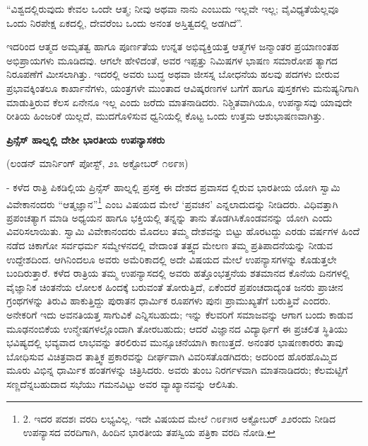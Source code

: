 “ವಿಶ್ವದಲ್ಲಿರುವುದು ಕೇವಲ ಒಂದೇ ಆತ್ಮ; ನೀವು ಅಥವಾ ನಾನು ಎಂಬುದು ಇಲ್ಲವೇ ಇಲ್ಲ; ವೈವಿಧ್ಯತೆಯೆಲ್ಲವೂ ಒಂದು ನಿರಪೇಕ್ಷ ಏಕದಲ್ಲಿ, ದೇವರೆಂಬ ಒಂದು ಅನಂತ ಅಸ್ತಿತ್ವದಲ್ಲಿ ಅಡಗಿದೆ”.

ಇದರಿಂದ ಆತ್ಮದ ಅಮೃತತ್ವ ಹಾಗೂ ಪೂರ್ಣತೆಯ ಉನ್ನತ ಅಭಿವ್ಯಕ್ತಿಯತ್ತ ಆತ್ಮಗಳ ಜನ್ಮಾಂತರ ಪ್ರಯಾಣಂತಹ ಅಭಿಪ್ರಾಯಗಳು ಮೂಡಿದವು. ಆಗಲೇ ಹೇಳಿದಂತೆ, ಅವರ ಇಪ್ಪತ್ತು ನಿಮಿಷಗಳ ಭಾಷಣ ಸಮಾರೋಪ ತ್ಯಾಗದ ನಿರೂಪಣೆಗೆ ಮೀಸಲಾಗಿತ್ತು. ಇದರಲ್ಲಿ ಅವರು ಬುದ್ಧ ಅಥವಾ ಜೀಸಸ್ನ ಬೋಧನೆಯ ಹಲವು ಪದಗಳು ಬೀರುವ ಪ್ರಭಾವಕ್ಕಿಂತಲೂ ಕಾರ್ಖಾನೆಗಳು, ಯಂತ್ರಗಳೇ ಮುಂತಾದ ಆವಿಷ್ಕರಣಗಳ ಬಗೆಗೆ ಹಾಗೂ ಪುಸ್ತಕಗಳು ಮನುಷ್ಯನಿಗಾಗಿ ಮಾಡುತ್ತಿರುವ ಕೆಲಸ ಏನೇನೂ ಇಲ್ಲ ಎಂದು ಜರೆದು ಮಾತನಾಡಿದರು. ನಿಶ್ಚಿತವಾಗಿಯೂ, ಉಪನ್ಯಾಸವು ಯಾವುದೇ ರೀತಿಯ ಹಿಂಜರಿಕೆ ಯಿಲ್ಲದೆ, ಮುದಗೊಳಿಸುವ ಧ್ವನಿಯಲ್ಲಿ ಕೊಟ್ಟ ಒಂದು ಉತ್ತಮ ಆಶುಭಾಷಣವಾಗಿತ್ತು.

\begin{center}
\textbf{ಪ್ರಿನ್ಸೆಸ್ ಹಾಲ್ನಲ್ಲಿ ದೇಶೀ ಭಾರತೀಯ ಉಪನ್ಯಾಸಕರು}
\end{center}

\begin{center}
(ಲಂಡನ್ ಮಾರ್ನಿಂಗ್ ಪೋಸ್ಟ್, ೨೩ ಅಕ್ಟೋಬರ್ ೧೮೯೫)
\end{center}

- ಕಳೆದ ರಾತ್ರಿ ಪಿಕಡಿಲ್ಲಿಯ ಪ್ರಿನ್ಸೆಸ್ ಹಾಲ್ನಲ್ಲಿ ಪ್ರಸಕ್ತ ಈ ದೇಶದ ಪ್ರವಾಸದ ಲ್ಲಿರುವ ಭಾರತೀಯ ಯೋಗಿ ಸ್ವಾಮಿ ವಿವೇಕಾನಂದರು “ಆತ್ಮಜ್ಞಾನ”\footnote{2. ಇದರ ಪದಶಃ ವರದಿ ಲಭ್ಯವಿಲ್ಲ. ಇದೇ ವಿಷಯದ ಮೇಲೆ ೧೮೯೫ರ ಅಕ್ಟೋಬರ್ ೨೨ರಂದು ನೀಡಿದ ಉಪನ್ಯಾಸದ ವರದಿಗಾಗಿ, ಹಿಂದಿನ ಭಾರತೀಯ ತಪಸ್ವಿಯ ಪತ್ರಿಕಾ ವರದಿ ನೋಡಿ.} ಎಂಬ ವಿಷಯದ ಮೇಲೆ ‘ಪ್ರವಚನ’ ಎನ್ನಲಾದುದನ್ನು ನೀಡಿದರು. ವಿಧಿವತ್ತಾಗಿ ಪ್ರಪಂಚತ್ಯಾಗ ಮಾಡಿ ಅಧ್ಯಯನ ಹಾಗೂ ಭಕ್ತಿಯಲ್ಲಿ ತನ್ನನ್ನು ತಾನು ತೊಡಗಿಸಿಕೊಂಡವನನ್ನು ಯೋಗಿ ಎಂದು ವಿವರಿಸಲಾಯಿತು. ಸ್ವಾಮಿ ವಿವೇಕಾನಂದರು ಮೊದಲು ತಮ್ಮ ದೇಶವನ್ನು ಬಿಟ್ಟು ಹೊರಟದ್ದು ಎರಡು ವರ್ಷಗಳ ಹಿಂದೆ ನಡೆದ ಚಿಕಾಗೋ ಸರ್ವಧರ್ಮ ಸಮ್ಮೇಳನದಲ್ಲಿ ವೇದಾಂತ ತತ್ತ್ವದ ಮೇಲಣ ತಮ್ಮ ಪ್ರತಿಪಾದನೆಯನ್ನು ನೀಡುವ ಉದ್ದೇಶದಿಂದ. ಆಗಿನಿಂದಲೂ ಅವರು ಅಮೆರಿಕಾದಲ್ಲಿ ಅದೇ ವಿಷಯದ ಮೇಲೆ ಉಪನ್ಯಾಸಗಳನ್ನು ಕೊಡುತ್ತಲೇ ಬಂದಿರುತ್ತಾರೆ. ಕಳೆದ ರಾತ್ರಿಯ ತಮ್ಮ ಉಪನ್ಯಾಸದಲ್ಲಿ ಅವರು ಹತ್ತೊಂಭತ್ತನೆಯ ಶತಮಾನದ ಕೊನೆಯ ದಿನಗಳಲ್ಲಿ ವೈಜ್ಞಾನಿಕ ಚಿಂತನೆಯ ಲೋಲಕ ಹಿಂದಕ್ಕೆ ಬರುವಂತೆ ತೋರುತ್ತಿದೆ, ಏಕೆಂದರೆ ಪ್ರಪಂಚದಾದ್ಯಂತ ಜನರು ಪ್ರಾಚೀನ ಗ್ರಂಥಗಳನ್ನು ತಿರುವಿ ಹಾಕುತ್ತಿದ್ದು ಪುರಾತನ ಧಾರ್ಮಿಕ ರೂಪಗಳು ಪುನಃ ಪ್ರಾಮುಖ್ಯತೆಗೆ ಬರುತ್ತಿವೆ ಎಂದರು. ಅನೇಕರಿಗೆ ಇದು ಅವನತಿಯತ್ತ ಸಾಗುವಿಕೆ ಎನ್ನಿಸಬಹುದು; ಇನ್ನು ಕೆಲವರಿಗೆ ಸಮಾಜವನ್ನು ಆಗಾಗ ಬಂದು ಕಾಡುವ ಮೂಢನಂಬಿಕೆಯ ಉನ್ಮೇಷಗಳಲ್ಲೊಂದಾಗಿ ತೋರಬಹುದು; ಆದರೆ ವಿಜ್ಞಾನದ ವಿದ್ಯಾರ್ಥಿಗೆ ಈ ಪ್ರಚಲಿತ ಸ್ಥಿತಿಯು ಭವಿಷ್ಯದಲ್ಲಿ ಭವ್ಯವಾದ ಲಾಭವನ್ನು ತರಲಿರುವ ಮುನ್ಸೂಚನೆಯಾಗಿ ಕಾಣುತ್ತದೆ. ಅನಂತರ ಭಾಷಣಕಾರರು ತಾವು ಬೋಧಿಸುವ ವಿಚಿತ್ರವಾದ ತಾತ್ತ್ವಿಕ ಪ್ರಕಾರವನ್ನು ದೀರ್ಘವಾಗಿ ವಿವರಿಸತೊಡಗಿದರು; ಅದರಿಂದ ಹೊರಹೊಮ್ಮಿದ ಮೂರು ವಿಭಿನ್ನ ಧಾರ್ಮಿಕ ಹಂತಗಳನ್ನು ಚಿತ್ರಿಸಿದರು. ಅವರು ತುಂಬ ನಿರರ್ಗಳವಾಗಿ ಮಾತನಾಡಿದರು; ಕೆಲಮಟ್ಟಿಗೆ ಸಣ್ಣದೆನ್ನಬಹುದಾದ ಸಭೆಯು ಗಮನವಿಟ್ಟು ಅವರ ವ್ಯಾಖ್ಯಾನವನ್ನು ಆಲಿಸಿತು.

